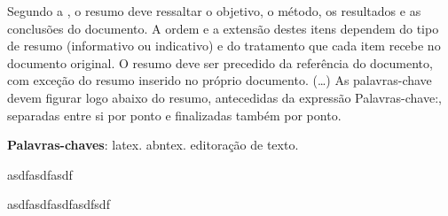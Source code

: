 \setlength{\absparsep}{18pt} %
 \begin{resumo}
 Segundo a , o resumo deve ressaltar o
 objetivo, o m\'{e}todo, os resultados e as conclus\~{o}es do documento. A ordem e a extens\~{a}o
 destes itens dependem do tipo de resumo (informativo ou indicativo) e do
 tratamento que cada item recebe no documento original. O resumo deve ser
 precedido da refer\^{e}ncia do documento, com exce\c{c}\~{a}o do resumo inserido no
 pr\'{o}prio documento. (\ldots) As palavras-chave devem figurar logo abaixo do
 resumo, antecedidas da express\~{a}o Palavras-chave:, separadas entre si por
 ponto e finalizadas tamb\'{e}m por ponto.

 \noindent
 \textbf{Palavras-chaves}: latex. abntex. editora\c{c}\~{a}o de texto.
\end{resumo}
asdfasdfasdf


asdfasdfasdfasdfsdf